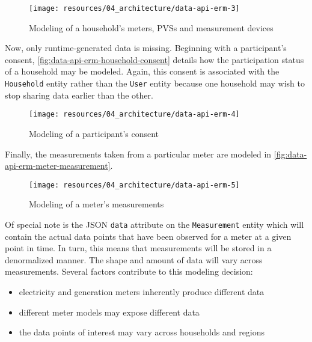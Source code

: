 \begin{figure}[hbt]
  \centering
  \texttt{[image: resources/04\_architecture/data-api-erm-3]}
  \caption{Modeling of a household's meters, \acsp{PVS} and measurement devices}
  \label{fig:data-api-erm-household-meter-device-pv}
\end{figure}

\FloatBarrier

Now, only runtime-generated data is missing. Beginning with a participant's consent, \autoref{fig:data-api-erm-household-consent} details how the participation status of a household may be modeled. Again, this consent is associated with the \texttt{Household} entity rather than the \texttt{User} entity because one household may wish to stop sharing data earlier than the other.

\begin{figure}[hbt]
  \centering
  \texttt{[image: resources/04\_architecture/data-api-erm-4]}
  \caption{Modeling of a participant's consent}
  \label{fig:data-api-erm-household-consent}
\end{figure}

\FloatBarrier

Finally, the measurements taken from a particular meter are modeled in \autoref{fig:data-api-erm-meter-measurement}.

\begin{figure}[hbt]
  \centering
  \texttt{[image: resources/04\_architecture/data-api-erm-5]}
  \caption{Modeling of a meter's measurements}
  \label{fig:data-api-erm-meter-measurement}
\end{figure}

\FloatBarrier

Of special note is the \acs{JSON} \texttt{data} attribute on the \texttt{Measurement} entity which will contain the actual data points that have been observed for a meter at a given point in time. In turn, this means that measurements will be stored in a denormalized manner. The shape and amount of data will vary across measurements. Several factors contribute to this modeling decision:

\begin{itemize}
  \item electricity and generation meters inherently produce different data
  \item different meter models may expose different data
  \item the data points of interest may vary across households and regions
\end{itemize}

